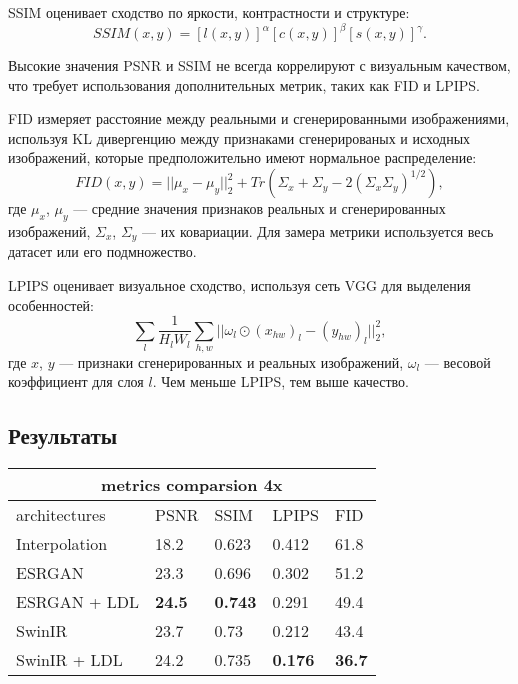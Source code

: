 \documentclass[14pt]{extarticle}
\begin{document}
SSIM оценивает сходство по яркости, контрастности и структуре:
$$
    SSIM(x, y) = [l(x, y)]^\alpha [c(x, y)]^\beta [s(x, y)]^\gamma.
$$

Высокие значения PSNR и SSIM не всегда коррелируют с визуальным качеством, что требует использования дополнительных метрик, таких как FID и LPIPS.

FID измеряет расстояние между реальными и сгенерированными изображениями, используя KL дивергенцию между признаками сгенерированых и исходных изображений, которые предположительно имеют нормальное распределение:
$$
    FID(x, y) = ||\mu_x - \mu_y||^2_2 + Tr(\Sigma_x + \Sigma_y - 2 (\Sigma_x \Sigma_y)^{1/2}),
$$
где $\mu_x$, $\mu_y$ — средние значения признаков реальных и сгенерированных изображений, $\Sigma_x$, $\Sigma_y$ — их ковариации. Для замера метрики используется весь датасет или его подмножество.

LPIPS оценивает визуальное сходство, используя сеть VGG для выделения особенностей:
$$
    \sum_{l} \frac{1}{H_l W_l} \sum_{h, w} ||\omega_l \odot (x_{hw})_l - (y_{hw})_l||^2_2,
$$
где $x$, $y$ — признаки сгенерированных и реальных изображений, $\omega_l$ — весовой коэффициент для слоя $l$. Чем меньше LPIPS, тем выше качество.


\subsection{Результаты}
\begin{center}
\begin{tabular}{ |p{5cm}||p{2cm}|p{2cm}|p{2cm}|p{2cm}|  }
 \hline
 \multicolumn{5}{|c|}{metrics comparsion 4x} \\
 \hline
 architectures& PSNR & SSIM & LPIPS & FID\\
 \hline
 Interpolation   & 18.2             &   0.623       & 0.412          & 61.8 \\
 ESRGAN          &  23.3            &   0.696       &  0.302         & 51.2       \\
 ESRGAN + LDL    &   \textbf{24.5}  & \textbf{0.743}& 0.291          & 49.4          \\
 SwinIR          &   23.7           &   0.73        &    0.212       &      43.4     \\
 SwinIR + LDL    & 24.2    &   0.735       &    \textbf{0.176} &      \textbf{36.7}       \\
 \hline
\end{tabular}
\end{center}
\end{document}
